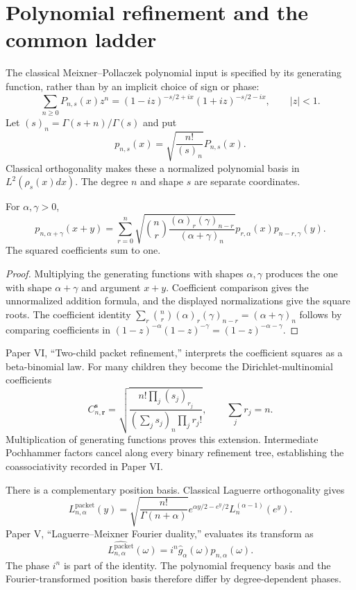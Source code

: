 \section{Polynomial refinement and the common ladder}

The classical Meixner--Pollaczek polynomial input is specified by its generating
function, rather than by an implicit choice of sign or phase:
\[
 \sum_{n\geq0}P_{n,s}(x)z^n
 =(1-iz)^{-s/2+ix}(1+iz)^{-s/2-ix},\qquad |z|<1.
\]
Let $(s)_n=\Gamma(s+n)/\Gamma(s)$ and put
\[
 p_{n,s}(x)=\sqrt{\frac{n!}{(s)_n}}P_{n,s}(x).
\]
Classical orthogonality makes these a normalized polynomial basis in
$L^2(\rho_s(x)dx)$. The degree $n$ and shape $s$ are separate coordinates.

\begin{theorem}
For $\alpha,\gamma>0$,
\[
 p_{n,\alpha+\gamma}(x+y)
 =\sum_{r=0}^{n}
 \sqrt{\binom nr\frac{(\alpha)_r(\gamma)_{n-r}}
 {(\alpha+\gamma)_n}}
 p_{r,\alpha}(x)p_{n-r,\gamma}(y).
\]
The squared coefficients sum to one.
\end{theorem}

\begin{proof}
Multiplying the generating functions with shapes $\alpha,\gamma$ produces the
one with shape $\alpha+\gamma$ and argument $x+y$. Coefficient comparison gives
the unnormalized addition formula, and the displayed normalizations give the
square roots. The coefficient identity
$\sum_r\binom nr(\alpha)_r(\gamma)_{n-r}=(\alpha+\gamma)_n$
follows by comparing coefficients in
$(1-z)^{-\alpha}(1-z)^{-\gamma}=(1-z)^{-\alpha-\gamma}$.
\end{proof}

Paper VI, ``Two-child packet refinement,'' interprets the coefficient squares
as a beta-binomial law. For many children they become the
Dirichlet-multinomial coefficients
\[
 C_{n,\mathbf r}^{\mathbf s}
 =\sqrt{\frac{n!\prod_j(s_j)_{r_j}}
 {(\sum_js_j)_n\prod_jr_j!}},\qquad \sum_jr_j=n.
\]
Multiplication of generating functions proves this extension. Intermediate
Pochhammer factors cancel along every binary refinement tree, establishing the
coassociativity recorded in Paper VI.

There is a complementary position basis. Classical Laguerre orthogonality gives
\[
 L_{n,\alpha}^{\mathrm{packet}}(y)
 =\sqrt{\frac{n!}{\Gamma(n+\alpha)}}
 e^{\alpha y/2-e^y/2}L_n^{(\alpha-1)}(e^y).
\]
Paper V, ``Laguerre--Meixner Fourier duality,'' evaluates its transform as
\[
 \widehat{L_{n,\alpha}^{\mathrm{packet}}}(\omega)
 =i^n\widehat g_\alpha(\omega)p_{n,\alpha}(\omega).
\]
The phase $i^n$ is part of the identity. The polynomial frequency basis and the
Fourier-transformed position basis therefore differ by degree-dependent phases.

